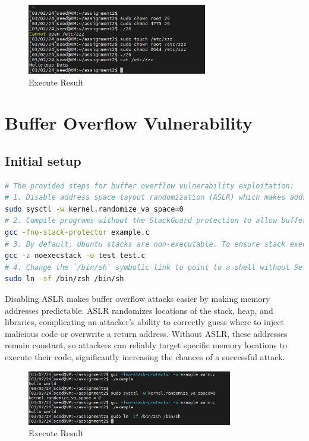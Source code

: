 \documentclass[a4paper,11pt]{article}
\begin{document}
\begin{figure}[h]
    \centering
       \includegraphics[width=0.7\textwidth]{figures/task6/task6.png}
    \caption{Execute Result}\label{fig:task6}
\end{figure}

\section{Buffer Overflow Vulnerability}

\subsection{Initial setup}

\begin{lstlisting}[caption={CMD},label={lst:task2.7},language=BASH,breaklines=true]
# The provided steps for buffer overflow vulnerability exploitation:
# 1. Disable address space layout randomization (ASLR) which makes address guessing difficult:
sudo sysctl -w kernel.randomize_va_space=0
# 2. Compile programs without the StackGuard protection to allow buffer overflow attacks:
gcc -fno-stack-protector example.c
# 3. By default, Ubuntu stacks are non-executable. To ensure stack executability is not a factor, compile programs with non-executable stack protection:
gcc -z noexecstack -o test test.c
# 4. Change the `/bin/sh` symbolic link to point to a shell without Set-UID restrictions like `zsh` (only for Ubuntu 16.04 as it has countermeasures in `dash`):
sudo ln -sf /bin/zsh /bin/sh
\end{lstlisting} 

Disabling ASLR makes buffer overflow attacks easier by making memory addresses predictable. ASLR randomizes locations of the stack, heap, and libraries, complicating an attacker's ability to correctly guess where to inject malicious code or overwrite a return address. Without ASLR, these addresses remain constant, so attackers can reliably target specific memory locations to execute their code, significantly increasing the chances of a successful attack.

\begin{figure}[h]
    \centering
       \includegraphics[width=0.8\textwidth]{figures/task7/task7.png}
    \caption{Execute Result}\label{fig:task7}
\end{figure}
\end{document}
